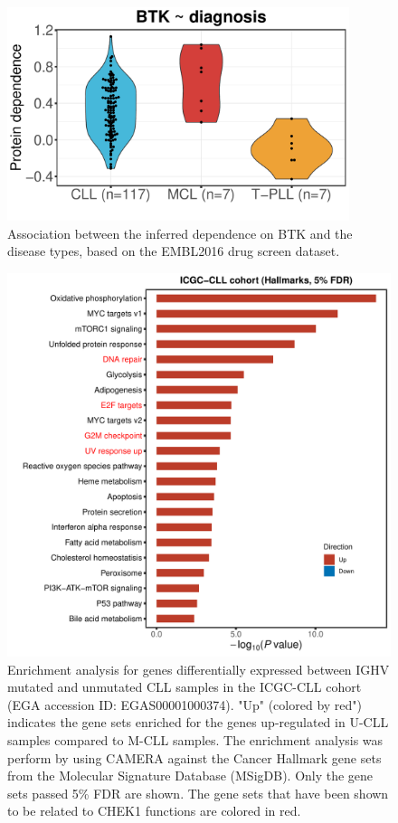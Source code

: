 \documentclass{scrartcl}
\begin{document}
\begin{figure}[h]
    \centering
    \includegraphics[width=10cm]{supp_BTKvsDiag-1}
    \caption{Association between the inferred dependence on BTK and the disease types, based on the EMBL2016 drug screen dataset.}
\end{figure}

\begin{figure}[h]
    \centering
    \includegraphics[width=15cm]{RNAseq_ICGC-1}
    \caption{Enrichment analysis for genes differentially expressed between IGHV mutated and unmutated CLL samples in the ICGC-CLL cohort (EGA accession ID: EGAS00001000374). "Up" (colored by red") indicates the gene sets enriched for the genes up-regulated in U-CLL samples compared to M-CLL samples. The enrichment analysis was perform by using CAMERA against the Cancer Hallmark gene sets from the Molecular Signature Database (MSigDB). Only the gene sets passed 5\% FDR are shown. The gene sets that have been shown to be related to CHEK1 functions are colored in red.}
\end{figure}
\end{document}
